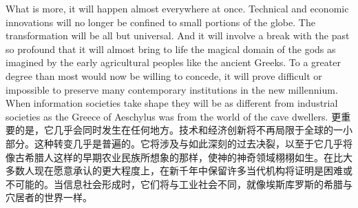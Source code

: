 \begin{paracol}{2}[]
What is more, it will happen almost everywhere at once. Technical and economic innovations will no longer be confined to small portions of the globe. The transformation will be all but universal. And it will involve a break with the past so profound that it will almost bring to life the magical domain of the gods as imagined by the early agricultural peoples like the ancient Greeks. To a greater degree than most would now be willing to concede, it will prove difficult or impossible to preserve many contemporary institutions in the new millennium. When information societies take shape they will be as different from industrial societies as the Greece of Aeschylus was from the world of the cave dwellers.
\switchcolumn
更重要的是，它几乎会同时发生在任何地方。技术和经济创新将不再局限于全球的一小部分。这种转变几乎是普遍的。它将涉及与如此深刻的过去决裂，以至于它几乎将像古希腊人这样的早期农业民族所想象的那样，使神的神奇领域栩栩如生。在比大多数人现在愿意承认的更大程度上，在新千年中保留许多当代机构将证明是困难或不可能的。当信息社会形成时，它们将与工业社会不同，就像埃斯库罗斯的希腊与穴居者的世界一样。
\end{paracol}

